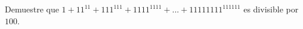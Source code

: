 Demuestre que $1 + 11^{11} + 111^{111} + 1111^{1111} +...+ 11111111^{111111}$ es divisible por $100$. 
